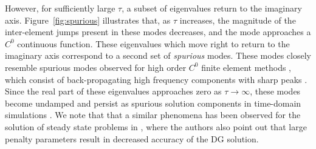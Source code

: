 \documentclass[preprint,10pt]{elsarticle}
\begin{document}
However, for sufficiently large $\tau$, a subset of eigenvalues return to the imaginary axis.  Figure~\ref{fig:spurious} illustrates that, as $\tau$ increases, the magnitude of the inter-element jumps present in these modes decreases, and the mode approaches a $C^0$ continuous function.  These eigenvalues which move right to return to the imaginary axis correspond to a second set of \emph{spurious} modes.  These modes closely resemble spurious modes observed for high order $C^0$ finite element methods \cite{boffi2000problem}, which consist of back-propagating high frequency components with sharp peaks \cite{ainsworth2014dispersive}.  Since the real part of these eigenvalues approaches zero as $\tau\rightarrow \infty$, these modes become undamped and persist as spurious solution components in time-domain simulations \cite{hughes2014finite}.  We note that that a similar phenomena has been observed for the solution of steady state problems in \cite{burman2010interior}, where the authors also point out that large penalty parameters result in decreased accuracy of the DG solution.  
\end{document}
